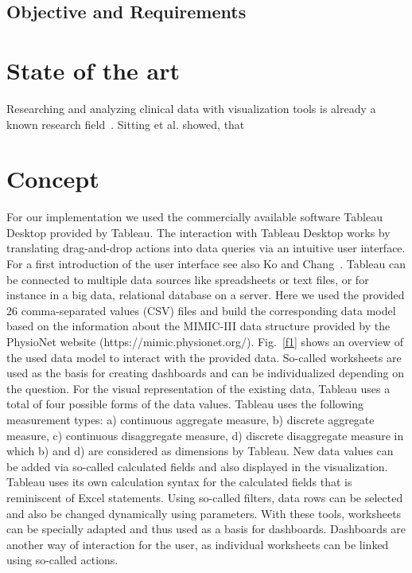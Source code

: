 \documentclass[aac,crcready]{iosart2x}
\begin{document}
\subsection{Objective and Requirements}\label{s1.2}



\section{State of the art}\label{s2}
Researching and analyzing clinical data with visualization tools is already a known research field~\cite{Caban.2015, Sittig.2015, UnberathPhilipp.2019, Festag.2019}. Sitting et al. showed, that 


\section{Concept}\label{s3}
For our implementation we used the commercially available software Tableau Desktop provided by Tableau\textregistered. The interaction with Tableau Desktop works by translating drag-and-drop actions into data queries via an intuitive user interface. For a first introduction of the user interface see also Ko and Chang~\cite{Ko.2017}. 
Tableau can be connected to multiple data sources like spreadsheets or text files, or for instance in a big data, relational database on a server. Here we used the provided 26 comma-separated values (CSV) files and build the corresponding data model based on the information about the MIMIC-III data structure provided by the PhysioNet website (https://mimic.physionet.org/). Fig.~\ref{f1} shows an overview of the used data model to interact with the provided data. So-called worksheets are used as the basis for creating dashboards and can be individualized depending on the question. For the visual representation of the existing data, Tableau uses a total of four possible forms of the data values. Tableau uses the following measurement types: a) continuous aggregate measure, b) discrete aggregate measure, c) continuous disaggregate measure, d) discrete disaggregate measure in which b) and d) are considered as dimensions by Tableau.
New data values can be added via so-called calculated fields and also displayed in the visualization. Tableau uses its own calculation syntax for the calculated fields that is reminiscent of Excel statements. Using so-called filters, data rows can be selected and also be changed dynamically using parameters. With these tools, worksheets can be specially adapted and thus used as a basis for dashboards. Dashboards are another way of interaction for the user, as individual worksheets can be linked using so-called actions.
\end{document}
